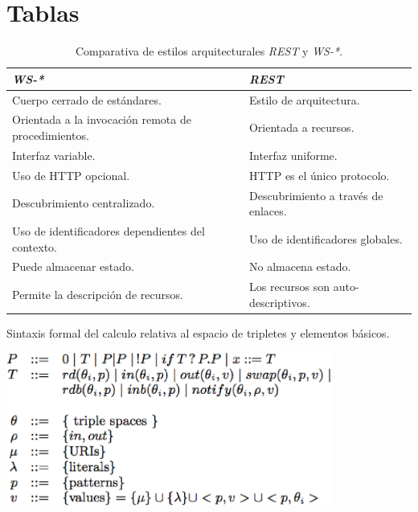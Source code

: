 \chapter{Tablas}

\begin{table}
\centering
\caption{Comparativa de estilos arquitecturales \textit{REST} y \textit{WS-*}.}
\label{restvsws}
\begin{center}
\begin{tabular}{|l|l|}\hline
\textbf{\textit{WS-*}} & \textbf{\textit{REST}} \\\hline
Cuerpo cerrado de est\'andares. & Estilo de arquitectura. \\
Orientada a la invocaci\'on remota de procedimientos. & Orientada a recursos. \\
Interfaz variable. & Interfaz uniforme.\\
Uso de HTTP opcional. & HTTP es el \'unico protocolo. \\
Descubrimiento centralizado. & Descubrimiento a trav\'es de enlaces.\\
Uso de identificadores dependientes del contexto. & Uso de identificadores globales.\\
Puede almacenar estado. & No almacena estado. \\
Permite la descripci\'on de recursos. & Los recursos son auto-descriptivos.\\\hline
\end{tabular}
\end{center}
\end{table}
\clearpage
\newpage


\begin{table}
\vspace{2.4in}
\caption{Sintaxis formal del calculo relativa al espacio de tripletes y elementos b\'asicos.}
\includegraphics[width=0.8\textwidth]{tabla1}
\label{tabla1}
\end{table}

\clearpage
\newpage


